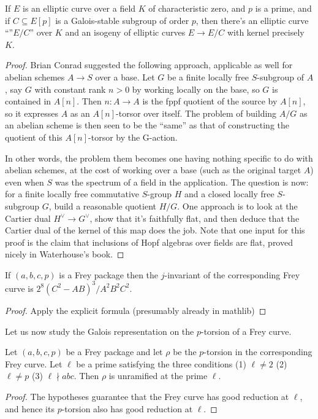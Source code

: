 \begin{theorem}\label{Elliptic_curve_quotient_by_finite_subgroup} If $E$ is an elliptic curve over a field $K$ of characteristic zero, and $p$ is a prime, and if $C\subseteq E[p]$ is a Galois-stable
  subgroup of order $p$, then there's an elliptic curve ``''$E/C$'' over $K$ and an isogeny of elliptic curves $E\to E/C$ with kernel precisely $K$.
\end{theorem}
\begin{proof}
  Brian Conrad suggested the following approach, applicable as well for abelian schemes $A\to S$ over a base.  Let $G$ be a finite locally free $S$-subgroup of $A$, say $G$ with constant rank $n > 0$ by working locally on the base, so $G$ is contained in $A[n]$.  Then $n: A \to A$ is the fppf quotient of the source by $A[n]$, so it expresses $A$ as an $A[n]$-torsor over itself.  The problem of building $A/G$ as an abelian scheme is then seen to be the “same” as that of constructing the quotient of this $A[n]$-torsor by the G-action.

  In other words, the problem them becomes one having nothing specific to do with abelian schemes, at the cost of working over a base (such as the original target $A$) even when $S$ was the spectrum of a field in the application. The question is now: for a finite locally free commutative $S$-group $H$ and a closed locally free $S$-subgroup $G$, build a reasonable quotient $H/G$. One approach is to look at the Cartier dual $H^\vee\to G^\vee$, show that it's faithfully flat, and then deduce that the Cartier dual of the kernel of this map does the job. Note that one input for this proof is the claim that inclusions of Hopf algebras over fields are flat, proved nicely in Waterhouse’s book.
\end{proof}
\begin{theorem}\label{Frey_curve_j} If $(a,b,c,p)$ is a Frey package then the $j$-invariant of the corresponding Frey curve is $2^8(C^2-AB)^3/A^2B^2C^2$.
\end{theorem}
\begin{proof}
  Apply the explicit formula (presumably already in mathlib)
\end{proof}

Let us now study the Galois representation on the $p$-torsion of a Frey curve.

\begin{theorem}\label{Frey_curve_mod_p_rep_at_good_primes} Let $(a,b,c,p)$ be a Frey package and let $\rho$ be
  the $p$-torsion in the corresponding Frey curve. Let $\ell$ be a prime satisfying the three
  conditions (1) $\ell\ne2$ (2) $\ell\ne p$ (3) $\ell\nmid abc$. Then $\rho$ is unramified at the prime $\ell$.
\end{theorem}
\begin{proof}
  The hypotheses guarantee that the Frey curve has good reduction at $\ell$, and hence its
  $p$-torsion also has good reduction at $\ell$.
\end{proof}

